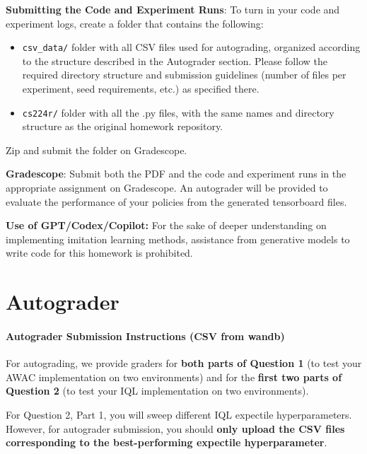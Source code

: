 \documentclass[12pt]{article}
\begin{document}
\vspace{0.2cm}

\noindent\textbf{Submitting the Code and Experiment Runs}: To turn in your code and experiment logs, create a folder that contains the following:

\begin{itemize}
\item \texttt{csv\_data/} folder with all CSV files used for autograding, organized according to the structure described in the Autograder section. Please follow the required directory structure and submission guidelines (number of files per experiment, seed requirements, etc.) as specified there.


\item \texttt{cs224r/} folder with all the .py files, with the same names and directory structure as the original homework repository. 
\end{itemize} 

Zip and submit the folder on Gradescope.
\vspace{0.2cm}

\noindent\textbf{Gradescope}: Submit both the PDF and the code and experiment runs in the appropriate assignment on Gradescope. An autograder will be provided to evaluate the performance of your policies from the generated tensorboard files. 

\vspace{0.2cm}

\noindent\textbf{Use of GPT/Codex/Copilot:} For the sake of deeper understanding on implementing imitation learning methods, assistance from generative models to write code for this homework is prohibited. 


\section*{Autograder}
\paragraph{Autograder Submission Instructions (CSV from wandb)}

For autograding, we provide graders for \textbf{both parts of Question 1} (to test your AWAC implementation on two environments) and for the \textbf{first two parts of Question 2} (to test your IQL implementation on two environments). 

For Question 2, Part 1, you will sweep different IQL expectile hyperparameters. However, for autograder submission, you should \textbf{only upload the CSV files corresponding to the best-performing expectile hyperparameter}.
\end{document}
